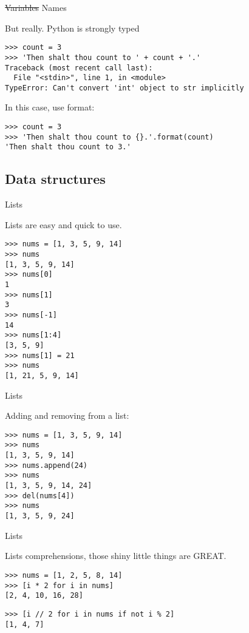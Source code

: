 \documentclass[ignorenonframetext,]{beamer}
\begin{document}
\begin{frame}[fragile]{\st{Variables} Names}

    But really. Python is strongly typed

    \begin{verbatim}
>>> count = 3
>>> 'Then shalt thou count to ' + count + '.'
Traceback (most recent call last):
  File "<stdin>", line 1, in <module>
TypeError: Can't convert 'int' object to str implicitly
    \end{verbatim}

    \pause
    In this case, use format:
    \begin{verbatim}
>>> count = 3
>>> 'Then shalt thou count to {}.'.format(count)
'Then shalt thou count to 3.'
    \end{verbatim}
\end{frame}

\subsection{Data structures}
\begin{frame}[fragile]{Lists}

    Lists are easy and quick to use.

    \begin{verbatim}
>>> nums = [1, 3, 5, 9, 14]
>>> nums
[1, 3, 5, 9, 14]
>>> nums[0]
1
>>> nums[1]
3
>>> nums[-1]
14
>>> nums[1:4]
[3, 5, 9]
>>> nums[1] = 21
>>> nums
[1, 21, 5, 9, 14]
    \end{verbatim}
\end{frame}

\begin{frame}[fragile]{Lists}

    Adding and removing from a list:

    \begin{verbatim}
>>> nums = [1, 3, 5, 9, 14]
>>> nums
[1, 3, 5, 9, 14]
>>> nums.append(24)
>>> nums
[1, 3, 5, 9, 14, 24]
>>> del(nums[4])
>>> nums
[1, 3, 5, 9, 24]
    \end{verbatim}
\end{frame}

\begin{frame}[fragile]{Lists}

    Lists comprehensions, those shiny little things are GREAT.

    \begin{verbatim}
>>> nums = [1, 2, 5, 8, 14]
>>> [i * 2 for i in nums]
[2, 4, 10, 16, 28]
    \end{verbatim}

    \pause
    \begin{verbatim}
>>> [i // 2 for i in nums if not i % 2]
[1, 4, 7]
    \end{verbatim}
\end{frame}
\end{document}
